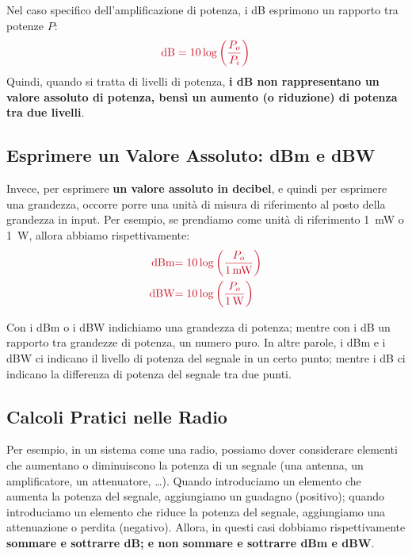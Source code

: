 \documentclass[openany,a4paper,12pt]{book}
\begin{document}
Nel caso specifico dell'amplificazione di potenza, i dB esprimono un rapporto tra potenze $P$:
\begin{equation}
    \textcolor{OpticRed}{\text{dB} = 10 \log \left(\frac{P_o}{P_i}\right)}
\end{equation}
Quindi, quando si tratta di livelli di potenza, \textbf{i dB non rappresentano un valore assoluto di potenza, bensì un aumento (o riduzione) di potenza tra due livelli}.

\subsection*{Esprimere un Valore Assoluto: dBm e dBW}

Invece, per esprimere \textbf{un valore assoluto in decibel}, e quindi per esprimere una grandezza, occorre porre una unità di misura di riferimento al posto della grandezza in input. Per esempio, se prendiamo come unità di riferimento \qty{1}{\milli\watt} o \qty{1}{\watt}, allora abbiamo rispettivamente:
\begin{align}
    \textcolor{OpticRed}{\text{dBm}} &\textcolor{OpticRed}{= 10 \log \left(\frac{P_o}{\qty{1}{\milli\watt}}\right)} \\
    \textcolor{OpticRed}{\text{dBW}} &\textcolor{OpticRed}{= 10 \log \left(\frac{P_o}{\qty{1}{\watt}}\right)}
\end{align}

Con i dBm o i dBW indichiamo una grandezza di potenza; mentre con i dB un rapporto tra grandezze di potenza, un numero puro. In altre parole, i dBm e i dBW ci indicano il livello di potenza del segnale in un certo punto; mentre i dB ci indicano la differenza di potenza del segnale tra due punti.

\subsection*{Calcoli Pratici nelle Radio}

Per esempio, in un sistema come una radio, possiamo dover considerare elementi che aumentano o diminuiscono la potenza di un segnale (una antenna, un amplificatore, un attenuatore, \dots). 
Quando introduciamo un elemento che aumenta la potenza del segnale, aggiungiamo un guadagno (positivo); quando introduciamo un elemento che riduce la potenza del segnale, aggiungiamo una attenuazione o perdita (negativo). 
Allora, in questi casi dobbiamo rispettivamente \textbf{sommare e sottrarre dB; e non sommare e sottrarre dBm e dBW}.
\end{document}
